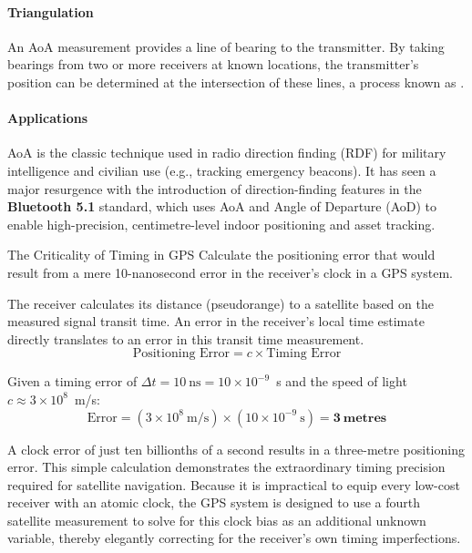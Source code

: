 \paragraph{Triangulation}
An AoA measurement provides a line of bearing to the transmitter. By taking bearings from two or more receivers at known locations, the transmitter's position can be determined at the intersection of these lines, a process known as .

\paragraph{Applications}
AoA is the classic technique used in radio direction finding (RDF) for military intelligence and civilian use (e.g., tracking emergency beacons). It has seen a major resurgence with the introduction of direction-finding features in the \textbf{Bluetooth 5.1} standard, which uses AoA and Angle of Departure (AoD) to enable high-precision, centimetre-level indoor positioning and asset tracking.

\begin{workedexample}{The Criticality of Timing in GPS}
    Calculate the positioning error that would result from a mere 10-nanosecond error in the receiver's clock in a GPS system.

    The receiver calculates its distance (pseudorange) to a satellite based on the measured signal transit time. An error in the receiver's local time estimate directly translates to an error in this transit time measurement.
    \[ \text{Positioning Error} = c \times \text{Timing Error} \]

    Given a timing error of \(\Delta t = 10~\text{ns} = 10 \times 10^{-9}\)~s and the speed of light \(c \approx 3 \times 10^8\)~m/s:
    \[ \text{Error} = (3 \times 10^8~\text{m/s}) \times (10 \times 10^{-9}~\text{s}) = \mathbf{3~\text{metres}} \]
    
    A clock error of just ten billionths of a second results in a three-metre positioning error. This simple calculation demonstrates the extraordinary timing precision required for satellite navigation. Because it is impractical to equip every low-cost receiver with an atomic clock, the GPS system is designed to use a fourth satellite measurement to solve for this clock bias as an additional unknown variable, thereby elegantly correcting for the receiver's own timing imperfections.
\end{workedexample}


